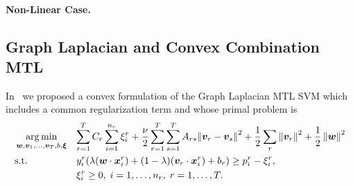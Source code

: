 \paragraph*{Non-Linear Case.\\}


\subsection{Graph Laplacian and Convex Combination MTL}



In~\cite{RuizAD21_hais} we proposed a convex formulation of the Graph Laplacian MTL SVM which includes a common regularization term and whose primal problem is
%
\begin{equation}\label{eq:primal_cvx-graphLap}
  \begin{aligned}
  & \argmin_{\myvec{w}, \myvec{v}_1, \ldots, \myvec{v}_T, b , \myvec{\xi}}
  & & { \sum_{r=1}^T C_r \sum_{i=1}^{n_r} {\xi_i^r}  + \frac{\nu}{2} \sum_{r=1}^T \sum_{s=1}^T A_{rs} {\| \myvec{v}_r - \myvec{v}_s \|}^2 + \frac{1}{2} \sum_r \norm{\myvec{v}_r}^2 + \frac{1}{2} \norm{\myvec{w}}^2} \\
  & \text{s.t.}
  & & y_i^r (\lambda (\myvec{w} \cdot \myvec{x}_i^r) + (1 - \lambda) (\myvec{v}_r \cdot \myvec{x}_i^r) + b_r) \geq p_i^r - \xi_i^r  ,\\
  & & & \xi_i^r \geq 0,  \;  i = 1, \dotsc, n_r, \; r=1, \dotsc, T .
  \end{aligned}
\end{equation}
%
